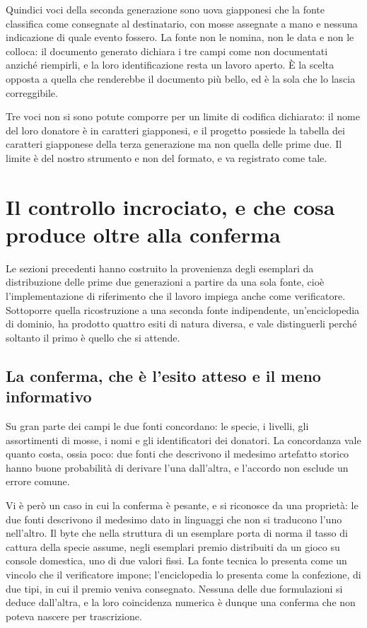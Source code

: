 Quindici voci della seconda generazione sono uova giapponesi che la fonte classifica come consegnate al destinatario, con mosse assegnate a mano e nessuna indicazione di quale evento fossero. La fonte non le nomina, non le data e non le colloca: il documento generato dichiara i tre campi come non documentati anziché riempirli, e la loro identificazione resta un lavoro aperto. È la scelta opposta a quella che renderebbe il documento più bello, ed è la sola che lo lascia correggibile.

Tre voci non si sono potute comporre per un limite di codifica dichiarato: il nome del loro donatore è in caratteri giapponesi, e il progetto possiede la tabella dei caratteri giapponese della terza generazione ma non quella delle prime due. Il limite è del nostro strumento e non del formato, e va registrato come tale.
\section{Il controllo incrociato, e che cosa produce oltre alla conferma}

Le sezioni precedenti hanno costruito la provenienza degli esemplari da distribuzione delle prime due generazioni a partire da una sola fonte, cioè l'implementazione di riferimento che il lavoro impiega anche come verificatore. Sottoporre quella ricostruzione a una seconda fonte indipendente, un'enciclopedia di dominio, ha prodotto quattro esiti di natura diversa, e vale distinguerli perché soltanto il primo è quello che si attende.

\subsection*{La conferma, che è l'esito atteso e il meno informativo}

Su gran parte dei campi le due fonti concordano: le specie, i livelli, gli assortimenti di mosse, i nomi e gli identificatori dei donatori. La concordanza vale quanto costa, ossia poco: due fonti che descrivono il medesimo artefatto storico hanno buone probabilità di derivare l'una dall'altra, e l'accordo non esclude un errore comune.

Vi è però un caso in cui la conferma è pesante, e si riconosce da una proprietà: le due fonti descrivono il medesimo dato in linguaggi che non si traducono l'uno nell'altro. Il byte che nella struttura di un esemplare porta di norma il tasso di cattura della specie assume, negli esemplari premio distribuiti da un gioco su console domestica, uno di due valori fissi. La fonte tecnica lo presenta come un vincolo che il verificatore impone; l'enciclopedia lo presenta come la confezione, di due tipi, in cui il premio veniva consegnato. Nessuna delle due formulazioni si deduce dall'altra, e la loro coincidenza numerica è dunque una conferma che non poteva nascere per trascrizione.

